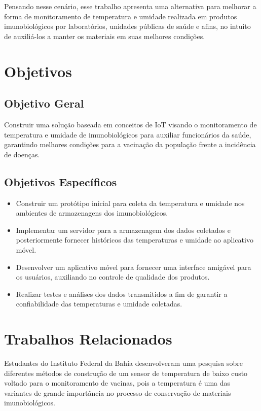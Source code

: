 Pensando nesse cenário, esse trabalho apresenta uma alternativa para melhorar a forma de monitoramento de temperatura e umidade realizada em produtos imunobiológicos por laboratórios, unidades públicas de saúde e afins, no intuito de auxiliá-los a manter os materiais em suas melhores condições.

\section{Objetivos}
\label{intro:objetivos}

\subsection{Objetivo Geral}
\label{intro:objetivos:geral}
Construir uma solução baseada em conceitos de IoT visando o monitoramento de temperatura e umidade de imunobiológicos para auxiliar funcionários da saúde, garantindo melhores condições para a vacinação da população frente a incidência de doenças.

\subsection{Objetivos Específicos}
\label{intro:objetivos:especificos}
\begin{itemize}
  \item Construir um protótipo inicial para coleta da temperatura e umidade nos ambientes de armazenagens dos imunobiológicos.
  \item Implementar um servidor para a armazenagem dos dados coletados e posteriormente fornecer históricos das temperaturas e umidade ao aplicativo móvel.
  \item Desenvolver um aplicativo móvel para fornecer uma interface amigável para os usuários, auxiliando no controle de qualidade dos produtos.
  \item Realizar testes e análises dos dados transmitidos a fim de garantir a confiabilidade das temperaturas e umidade coletadas.
\end{itemize}

\section{Trabalhos Relacionados}
\label{fund:trabalhos-relacionados}
Estudantes do Instituto Federal da Bahia desenvolveram uma pesquisa \cite{cruzdesenvolvimento} sobre diferentes métodos de construção de um sensor de temperatura de baixo custo voltado para o monitoramento de vacinas, pois a temperatura é uma das variantes de grande importância no  processo de conservação de materiais imunobiológicos.

